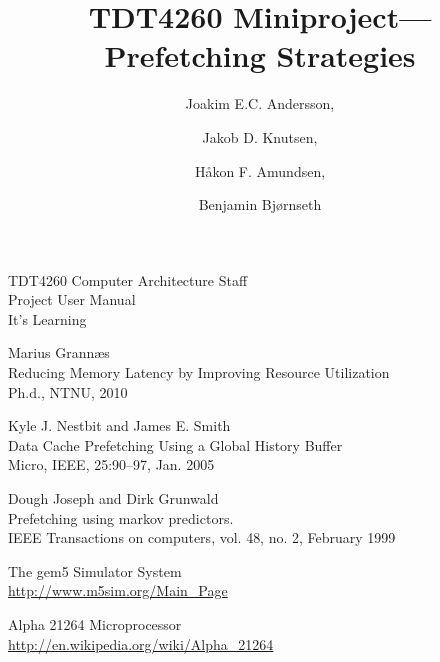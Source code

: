 \documentclass[journal]{IEEEtran/IEEEtran}
\title{TDT4260 Miniproject---Prefetching Strategies}
\author{Joakim E.C. Andersson, \and Jakob D. Knutsen, \and Håkon F. Amundsen, \and Benjamin Bjørnseth}
\begin{document}
\maketitle











\begin{thebibliography}{9}

TDT4260 Computer Architecture Staff\\
Project User Manual\\
It's Learning

Marius Grannæs\\
Reducing Memory Latency by Improving Resource Utilization\\
Ph.d., NTNU, 2010

Kyle J. Nestbit and James E. Smith\\
Data Cache Prefetching Using a Global History Buffer\\
Micro, IEEE, 25:90–97, Jan. 2005

Dough Joseph and Dirk Grunwald\\
Prefetching using markov predictors.\\
IEEE Transactions on computers, vol. 48, no. 2, February 1999

The gem5 Simulator System\\
\url{http://www.m5sim.org/Main_Page}

Alpha 21264 Microprocessor\\
\url{http://en.wikipedia.org/wiki/Alpha_21264}

\end{thebibliography}
\end{document}
